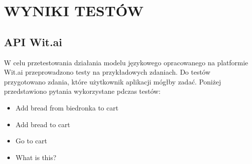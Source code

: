 \chapter{WYNIKI TESTÓW}
\label{chapter:wyniki_testow}

\section{API Wit.ai}
\label{section:witai}
W celu przetestowania działania modelu językowego opracowanego na platformie Wit.ai przeprowadzono testy na przykładowych zdaniach. Do testów przygotowano zdania, które użytkownik aplikacji mógłby zadać. Poniżej przedstawiono pytania wykorzystane pdczas testów:

\begin{itemize}
    \item Add bread from biedronka to cart
    \item Add bread to cart
    \item Go to cart
    \item What is this?
\end{itemize}


